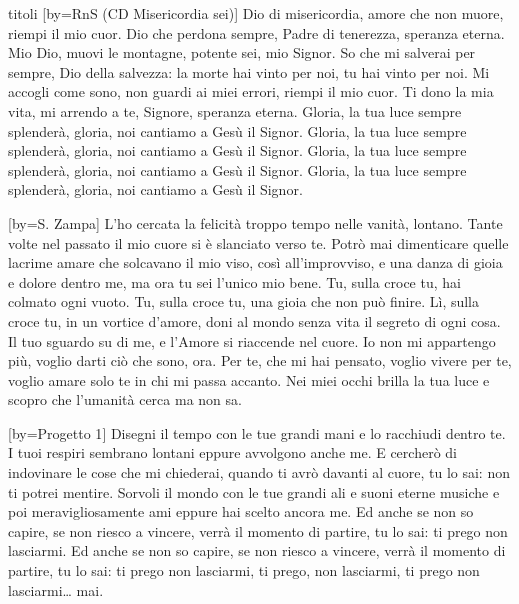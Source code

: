 \begin{songs}{titoli}
[by={RnS (CD Misericordia sei)}]
\beginverse
Dio di misericordia,
amore che non muore,
riempi il mio cuor.
Dio che perdona sempre,
Padre di tenerezza,
speranza eterna.
\endverse
\beginchorus
Mio Dio, muovi le montagne,
potente sei, mio Signor.
So che mi salverai per sempre,
Dio della salvezza:
la morte hai vinto per noi,
tu hai vinto per noi.
\endchorus
\beginverse
Mi accogli come sono,
non guardi ai miei errori,
riempi il mio cuor.
Ti dono la mia vita,
mi arrendo a te, Signore,
speranza eterna.
\endverse
\beginverse*
Gloria, la tua luce sempre splenderà,
gloria, noi cantiamo a Gesù il Signor.
Gloria, la tua luce sempre splenderà,
gloria, noi cantiamo a Gesù il Signor.
\endverse
\beginverse*
Gloria, la tua luce sempre splenderà,
gloria, noi cantiamo a Gesù il Signor.
Gloria, la tua luce sempre splenderà,
gloria, noi cantiamo a Gesù il Signor.
\endverse
\endsong

[by={S. Zampa}]
\beginverse
L'ho cercata la felicità
troppo tempo nelle vanità, lontano.
Tante volte nel passato
il mio cuore si è slanciato verso te.
Potrò mai dimenticare quelle lacrime amare
che solcavano il mio viso, così all'improvviso,
e una danza di gioia e dolore dentro me,
ma ora tu sei l'unico mio bene.
\endverse
\beginchorus
Tu, sulla croce tu, hai colmato ogni vuoto.
Tu, sulla croce tu, una gioia che non può finire.
Lì, sulla croce tu, in un vortice d'amore,
doni al mondo senza vita il segreto di ogni cosa.
\endchorus
\beginverse
Il tuo sguardo su di me,
e l'Amore si riaccende nel cuore.
Io non mi appartengo più,
voglio darti ciò che sono, ora.
Per te, che mi hai pensato, voglio vivere per te,
voglio amare solo te in chi mi passa accanto.
Nei miei occhi brilla la tua luce e scopro che
l'umanità cerca ma non sa.
\endverse
\endsong

[by={Progetto 1}]
\beginverse
Disegni il tempo con le tue grandi mani
e lo racchiudi dentro te.
I tuoi respiri sembrano lontani
eppure avvolgono anche me.
E cercherò di indovinare
le cose che mi chiederai,
quando ti avrò davanti al cuore, tu lo sai:
non ti potrei mentire.
\endverse
\beginverse
Sorvoli il mondo con le tue grandi ali
e suoni eterne musiche
e poi meravigliosamente ami
eppure hai scelto ancora me.
Ed anche se non so capire,
se non riesco a vincere,
verrà il momento di partire, tu lo sai:
ti prego non lasciarmi.
\endverse
\beginverse*
Ed anche se non so capire,
se non riesco a vincere,
verrà il momento di partire, tu lo sai:
ti prego non lasciarmi, ti prego,
non lasciarmi, ti prego non lasciarmi… mai.
\endverse
\endsong


\end{songs}
